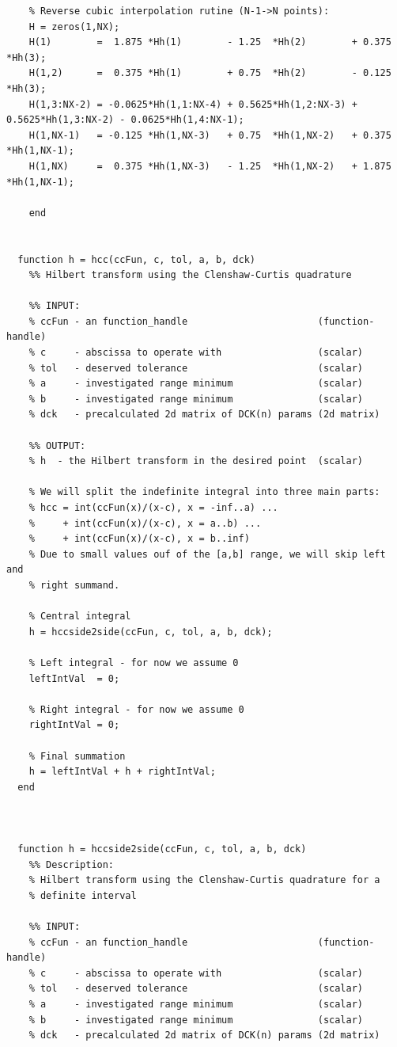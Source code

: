 \documentclass[12pt,twoside,a4paper]{article}
\numberwithin{equation}{subsection}
\numberwithin{figure}{subsection}
\begin{document}
\begin{lstlisting}
    % Reverse cubic interpolation rutine (N-1->N points):
    H = zeros(1,NX);
    H(1)        =  1.875 *Hh(1)        - 1.25  *Hh(2)        + 0.375 *Hh(3);
    H(1,2)      =  0.375 *Hh(1)        + 0.75  *Hh(2)        - 0.125 *Hh(3);
    H(1,3:NX-2) = -0.0625*Hh(1,1:NX-4) + 0.5625*Hh(1,2:NX-3) + 0.5625*Hh(1,3:NX-2) - 0.0625*Hh(1,4:NX-1);
    H(1,NX-1)   = -0.125 *Hh(1,NX-3)   + 0.75  *Hh(1,NX-2)   + 0.375 *Hh(1,NX-1);
    H(1,NX)     =  0.375 *Hh(1,NX-3)   - 1.25  *Hh(1,NX-2)   + 1.875 *Hh(1,NX-1);

    end


  function h = hcc(ccFun, c, tol, a, b, dck)
    %% Hilbert transform using the Clenshaw-Curtis quadrature

    %% INPUT:
    % ccFun - an function_handle                       (function-handle) 
    % c     - abscissa to operate with                 (scalar)
    % tol   - deserved tolerance                       (scalar)
    % a     - investigated range minimum               (scalar)
    % b     - investigated range minimum               (scalar)
    % dck   - precalculated 2d matrix of DCK(n) params (2d matrix)    

    %% OUTPUT:
    % h  - the Hilbert transform in the desired point  (scalar)

    % We will split the indefinite integral into three main parts:
    % hcc = int(ccFun(x)/(x-c), x = -inf..a) ...
    %     + int(ccFun(x)/(x-c), x = a..b) ...
    %     + int(ccFun(x)/(x-c), x = b..inf)
    % Due to small values ouf of the [a,b] range, we will skip left and
    % right summand.

    % Central integral
    h = hccside2side(ccFun, c, tol, a, b, dck);

    % Left integral - for now we assume 0
    leftIntVal  = 0;

    % Right integral - for now we assume 0
    rightIntVal = 0;

    % Final summation
    h = leftIntVal + h + rightIntVal;
  end



  function h = hccside2side(ccFun, c, tol, a, b, dck)
    %% Description:
    % Hilbert transform using the Clenshaw-Curtis quadrature for a
    % definite interval

    %% INPUT:
    % ccFun - an function_handle                       (function-handle) 
    % c     - abscissa to operate with                 (scalar)
    % tol   - deserved tolerance                       (scalar)
    % a     - investigated range minimum               (scalar)
    % b     - investigated range minimum               (scalar)
    % dck   - precalculated 2d matrix of DCK(n) params (2d matrix)    


\end{lstlisting}
\end{document}
